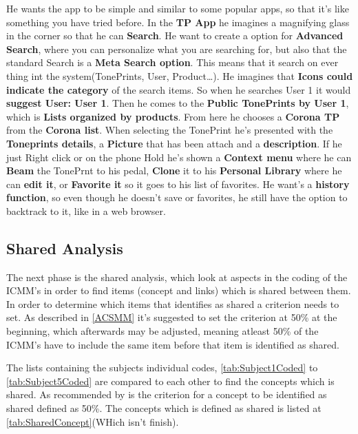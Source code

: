 He wants the app to be simple and similar to some popular apps, so that it’s like something you have tried before. In the \textbf{TP App} he imagines a magnifying glass in the corner so that he can \textbf{Search}. He want to create a option for \textbf{Advanced Search}, where you can personalize what you are searching for, but also that the standard Search is a \textbf{Meta Search option}. This means that it search on ever thing int the system(TonePrints, User, Product…). He imagines that \textbf{Icons could indicate the category} of the search items. So when he searches User 1 it would \textbf{suggest User: User 1}. Then he comes to the \textbf{Public TonePrints by User 1}, which is \textbf{Lists organized by products}. From here he chooses a \textbf{Corona TP} from the \textbf{Corona list}. When selecting the TonePrint he’s presented with the \textbf{Toneprints details}, a \textbf{Picture} that has been attach and a \textbf{description}. If he just Right click or on the phone Hold he’s shown a \textbf{Context menu} where he can \textbf{Beam} the TonePrnt to his pedal, \textbf{Clone} it to his \textbf{Personal Library} where he can \textbf{edit it}, or \textbf{Favorite it} so it goes to his list of favorites. He want’s a \textbf{history function}, so even though he doesn’t save or favorites, he still have the option to backtrack to it, like in a web browser. 

\subsection{Shared Analysis}
\label{SharedAnalysis}
The next phase is the shared analysis, which look at aspects in the coding of the ICMM's in order to find items (concept and links) which is shared between them. In order to determine which items that identifies as shared a criterion needs to set. As described in \autoref{ACSMM} it's suggested to set the criterion at 50\% at the beginning, which afterwards may be adjusted, meaning atleast 50\% of the ICMM's have to include the same item before that item is identified as shared. 

The lists containing the subjects individual codes, \autoref{tab:Subject1Coded} to \autoref{tab:Subject5Coded} are compared to each other to find the concepts which is shared. As recommended by \textcite{WEB:ConceptMapAnalysis} is the criterion for a concept to be identified as shared defined as 50\%. The concepts which is defined as shared is listed at \autoref{tab:SharedConcept}(WHich isn't finish). 


